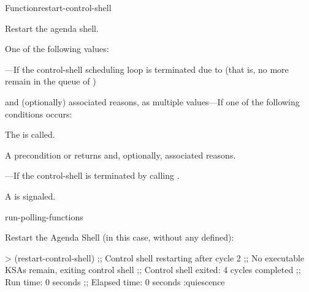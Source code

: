 \documentclass[10pt,twoside,english,pdftex]{article}
\begin{document}
\begin{functiondoc}{Function}{restart-control-shell}{\noargs
\returns{} \superstar}
%
%
%

\fnsyntax

\fnpurpose Restart the agenda shell.

\fnpackage {}

\fnmodule {}

\fnreturns
One of the following values: 
\begin{tightitemize}
\item {}---If the control-shell scheduling loop is terminated
  due to  (that is, no more  remain 
  in the queue of ) 
\item {} and (optionally) associated reasons, as multiple
  values---If one of the following conditions occurs:
\begin{tightitemize}
\item The \textbf{}  is
  called.
\item A precondition  or  
  returns  and, optionally, associated reasons.
\end{tightitemize}
\item {}---If the control-shell is terminated by
  calling \textbf{}.
\end{tightitemize}

\fnevents
{}%
%
%
A  is signaled.
 
\begin{alsos}{run-polling-functions}
\end{alsos}

\fnexample
Restart the Agenda Shell (in this case, without any  defined):
\begin{example}
> (restart-control-shell)
;; Control shell restarting after cycle 2
;; No executable KSAs remain, exiting control shell
;; Control shell exited: 4 cycles completed
;; Run time: 0 seconds
;; Elapsed time: 0 seconds
:quiescence
\end{example}

%
\fnnotes \pollingnote

\end{functiondoc}
\end{document}
